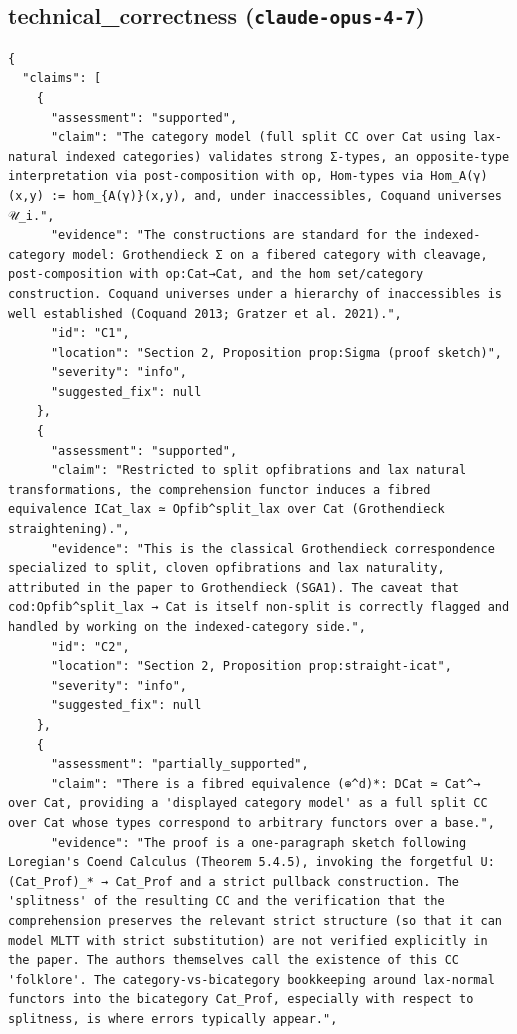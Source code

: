 \documentclass[11pt]{article}
\begin{document}
\subsection*{technical_correctness (\texttt{claude-opus-4-7})}
\begin{verbatim}
{
  "claims": [
    {
      "assessment": "supported",
      "claim": "The category model (full split CC over Cat using lax-natural indexed categories) validates strong Σ-types, an opposite-type interpretation via post-composition with op, Hom-types via Hom_A(γ)(x,y) := hom_{A(γ)}(x,y), and, under inaccessibles, Coquand universes 𝒰_i.",
      "evidence": "The constructions are standard for the indexed-category model: Grothendieck Σ on a fibered category with cleavage, post-composition with op:Cat→Cat, and the hom set/category construction. Coquand universes under a hierarchy of inaccessibles is well established (Coquand 2013; Gratzer et al. 2021).",
      "id": "C1",
      "location": "Section 2, Proposition prop:Sigma (proof sketch)",
      "severity": "info",
      "suggested_fix": null
    },
    {
      "assessment": "supported",
      "claim": "Restricted to split opfibrations and lax natural transformations, the comprehension functor induces a fibred equivalence ICat_lax ≃ Opfib^split_lax over Cat (Grothendieck straightening).",
      "evidence": "This is the classical Grothendieck correspondence specialized to split, cloven opfibrations and lax naturality, attributed in the paper to Grothendieck (SGA1). The caveat that cod:Opfib^split_lax → Cat is itself non-split is correctly flagged and handled by working on the indexed-category side.",
      "id": "C2",
      "location": "Section 2, Proposition prop:straight-icat",
      "severity": "info",
      "suggested_fix": null
    },
    {
      "assessment": "partially_supported",
      "claim": "There is a fibred equivalence (⊕^d)*: DCat ≃ Cat^→ over Cat, providing a 'displayed category model' as a full split CC over Cat whose types correspond to arbitrary functors over a base.",
      "evidence": "The proof is a one-paragraph sketch following Loregian's Coend Calculus (Theorem 5.4.5), invoking the forgetful U:(Cat_Prof)_* → Cat_Prof and a strict pullback construction. The 'splitness' of the resulting CC and the verification that the comprehension preserves the relevant strict structure (so that it can model MLTT with strict substitution) are not verified explicitly in the paper. The authors themselves call the existence of this CC 'folklore'. The category-vs-bicategory bookkeeping around lax-normal functors into the bicategory Cat_Prof, especially with respect to splitness, is where errors typically appear.",

\end{verbatim}
\end{document}
